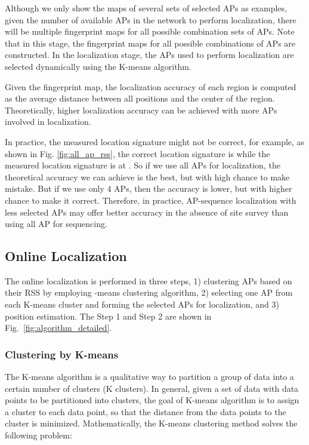 \documentclass[10pt, conference, letterpaper]{IEEEtran}
\begin{document}
Although we only show the maps of several sets of selected APs as examples, 
given the number of available APs in the network to perform localization, there will be multiple fingerprint maps for all possible combination sets of APs. 
Note that in this stage, the fingerprint maps for all possible combinations of APs are constructed. 
In the localization stage, the APs used to perform localization are selected dynamically using the K-means algorithm.

Given the fingerprint map, the localization accuracy of each region is computed as the average distance between all positions and the center of the region. 
Theoretically, higher localization accuracy can be achieved with more APs involved in localization. 

In practice, the measured location signature might not be correct, 
for example, as shown in Fig. \ref{fig:all_ap_rss}, the correct location signature is  while the measured location signature is  at . 
So if we use all APs for localization, the theoretical accuracy we can achieve is the best, but with high chance to make mistake. 
But if we use only 4 APs, then the accuracy is lower, but with higher chance to make it correct. 
Therefore, in practice, AP-sequence localization with less selected APs may offer better accuracy in the absence of site survey than using all AP for sequencing. 

\subsection{Online Localization}
\label{subsection:online_localization}
The online localization is performed in three steps, 
1) clustering APs based on their RSS by employing -means clustering algorithm, 
2) selecting one AP from each K-means cluster and forming the selected APs for localization, 
and 3) position estimation. The Step 1 and Step 2 are shown in Fig.~\ref{fig:algorithm_detailed}.

\subsubsection{Clustering by K-means}
The K-means algorithm is a qualitative way to partition a group of data into a certain number of clusters (K clusters). 
In general, given a set of data  with  data points  to be partitioned into  clusters, 
the goal of K-means algorithm is to assign a cluster to each data point, so that the distance from the data points to the cluster is minimized. 
Mathematically, the K-means clustering method solves the following problem:
\end{document}
